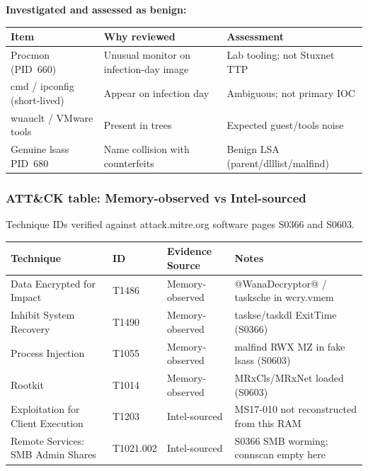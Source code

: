\documentclass[11pt,letterpaper]{article}
\begin{document}
\noindent\textbf{Investigated and assessed as benign:}
{\small
\begin{tabularx}{\textwidth}{@{}P{1.35in} Y P{1.7in}@{}}
\toprule
Item & Why reviewed & Assessment \\
\midrule
Procmon (PID~660) & Unusual monitor on infection-day image & Lab tooling; not Stuxnet TTP \\
cmd / ipconfig (short-lived) & Appear on infection day & Ambiguous; not primary IOC \\
wuauclt / VMware tools & Present in trees & Expected guest/tools noise \\
Genuine lsass PID~680 & Name collision with counterfeits & Benign LSA (parent/dlllist/malfind) \\
\bottomrule
\end{tabularx}}

\subsubsection*{ATT\&CK table: Memory-observed vs Intel-sourced}
Technique IDs verified against attack.mitre.org software pages S0366 and S0603.

{\small
\begin{tabularx}{\textwidth}{@{}P{1.35in} P{0.55in} P{1.05in} Y@{}}
\toprule
Technique & ID & Evidence Source & Notes \\
\midrule
Data Encrypted for Impact & T1486 & Memory-observed & @WanaDecryptor@ / tasksche in wcry.vmem \\
Inhibit System Recovery & T1490 & Memory-observed & taskse/taskdl ExitTime (S0366) \\
Process Injection & T1055 & Memory-observed & malfind RWX MZ in fake lsass (S0603) \\
Rootkit & T1014 & Memory-observed & MRxCls/MRxNet loaded (S0603) \\
Exploitation for Client Execution & T1203 & Intel-sourced & MS17-010 not reconstructed from this RAM \\
Remote Services: SMB Admin Shares & T1021.002 & Intel-sourced & S0366 SMB worming; connscan empty here \\
\bottomrule
\end{tabularx}}
\end{document}
